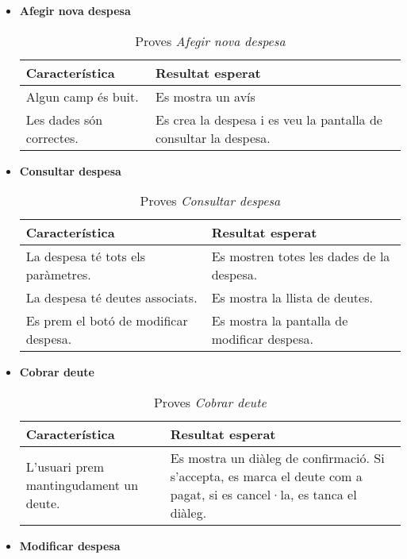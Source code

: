 \begin{itemize}
\item{}\textbf{Afegir nova despesa}

\begin{table}[!h]
\centering
\begin{tabular}{|T|T|}
\hline
\textbf{Característica} & \textbf{Resultat esperat} \\\hline
Algun camp és buit. & Es mostra un avís\\\hline
Les dades són correctes. & Es crea la despesa i es veu la pantalla de consultar la despesa.\\\hline
\end{tabular}
\label{}
\caption{Proves \textit{Afegir nova despesa}}
\end{table}

\clearpage

\item{}\textbf{Consultar despesa}

\begin{table}[!h]
\centering
\begin{tabular}{|T|T|}
\hline
\textbf{Característica} & \textbf{Resultat esperat} \\\hline
La despesa té tots els paràmetres. & Es mostren totes les dades de la despesa.\\\hline
La despesa té deutes associats. & Es mostra la llista de deutes.\\\hline
Es prem el botó de modificar despesa. & Es mostra la pantalla de modificar despesa.\\\hline
\end{tabular}
\label{}
\caption{Proves \textit{Consultar despesa}}
\end{table}

\item{}\textbf{Cobrar deute}

\begin{table}[!h]
\centering
\begin{tabular}{|T|T|}
\hline
\textbf{Característica} & \textbf{Resultat esperat} \\\hline
L'usuari prem mantingudament un deute. & Es mostra un diàleg de confirmació. Si s'accepta, es marca el deute com a pagat, si es cancel·la, es tanca el diàleg.\\\hline
\end{tabular}
\label{}
\caption{Proves \textit{Cobrar deute}}
\end{table}

\item{}\textbf{Modificar despesa}


\end{itemize}
